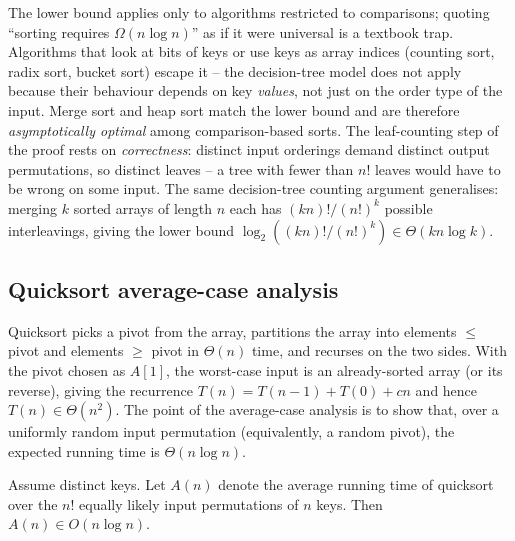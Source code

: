 \begin{remark}
The lower bound applies only to algorithms restricted to comparisons; quoting ``sorting requires $\Omega(n \log n)$'' as if it were universal is a textbook trap. Algorithms that look at bits of keys or use keys as array indices (counting sort, radix sort, bucket sort) escape it -- the decision-tree model does not apply because their behaviour depends on key \emph{values}, not just on the order type of the input. Merge sort and heap sort match the lower bound and are therefore \emph{asymptotically optimal} among comparison-based sorts. The leaf-counting step of the proof rests on \emph{correctness}: distinct input orderings demand distinct output permutations, so distinct leaves -- a tree with fewer than $n!$ leaves would have to be wrong on some input. The same decision-tree counting argument generalises: merging $k$ sorted arrays of length $n$ each has $(kn)!/(n!)^k$ possible interleavings, giving the lower bound $\log_2((kn)!/(n!)^k) \in \Theta(kn \log k)$.
\end{remark}

\subsection{Quicksort average-case analysis}

Quicksort picks a pivot from the array, partitions the array into elements $\le$ pivot and elements $\ge$ pivot in $\Theta(n)$ time, and recurses on the two sides. With the pivot chosen as $A[1]$, the worst-case input is an already-sorted array (or its reverse), giving the recurrence $T(n) = T(n-1) + T(0) + cn$ and hence $T(n) \in \Theta(n^2)$. The point of the average-case analysis is to show that, over a uniformly random input permutation (equivalently, a random pivot), the expected running time is $\Theta(n \log n)$.

\begin{theorem}
\label{thm:quicksort_avg}
Assume distinct keys. Let $A(n)$ denote the average running time of quicksort over the $n!$ equally likely input permutations of $n$ keys. Then $A(n) \in O(n \log n)$.
\end{theorem}

